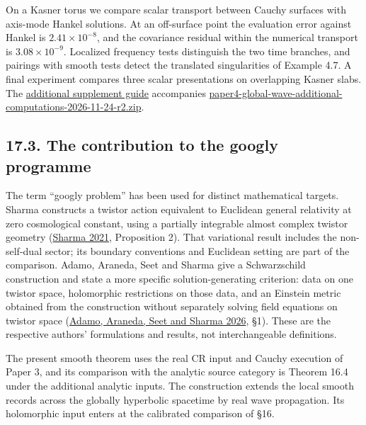 \documentclass[
  english,
  11pt,
  reqno]{amsart}
\begin{document}
On a Kasner torus we compare scalar transport between Cauchy surfaces
with axis-mode Hankel solutions. At an off-surface point the evaluation
error against Hankel is \(2.41\times10^{-8}\), and the covariance
residual within the numerical transport is \(3.08\times10^{-9}\).
Localized frequency tests distinguish the two time branches, and
pairings with smooth tests detect the translated singularities of
Example 4.7. A final experiment compares three scalar presentations on
overlapping Kasner slabs. The
\href{../additional-computations/paper4-global-wave-additional-computations-2026-11-24-r2/README.md}{additional
supplement guide} accompanies
\href{https://github.com/lioristhmus/smooth-global-twistor-sources/releases/download/v1.1/paper4-global-wave-additional-computations-2026-11-24-r2.zip}{paper4-global-wave-additional-computations-2026-11-24-r2.zip}.

\protect{}\label{sec:googly-literature-scope}

\subsection{17.3. The contribution to the googly
programme}\label{the-contribution-to-the-googly-programme}

The term ``googly problem'' has been used for distinct mathematical
targets. Sharma constructs a twistor action equivalent to Euclidean
general relativity at zero cosmological constant, using a partially
integrable almost complex twistor geometry
(\hyperref[ref-Sharma2021]{Sharma 2021}, Proposition 2). That
variational result includes the non-self-dual sector; its boundary
conventions and Euclidean setting are part of the comparison. Adamo,
Araneda, Seet and Sharma give a Schwarzschild construction and state a
more specific solution-generating criterion: data on one twistor space,
holomorphic restrictions on those data, and an Einstein metric obtained
from the construction without separately solving field equations on
twistor space (\hyperref[ref-AdamoAranedaSeetSharma2026]{Adamo, Araneda,
Seet and Sharma 2026}, §1). These are the respective authors'
formulations and results, not interchangeable definitions.

The present smooth theorem uses the real CR input and Cauchy execution
of Paper 3, and its comparison with the analytic source category is
Theorem 16.4 under the additional analytic inputs. The construction
extends the local smooth records across the globally hyperbolic
spacetime by real wave propagation. Its holomorphic input enters at the
calibrated comparison of §16.
\end{document}
